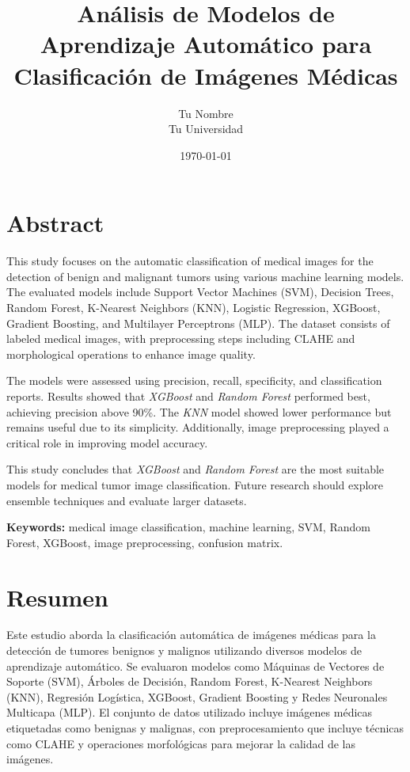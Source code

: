 \documentclass[12pt]{article}
\title{Análisis de Modelos de Aprendizaje Automático para Clasificación de Imágenes Médicas}
\author{Tu Nombre \\ Tu Universidad}
\date{\today}
\begin{document}
\maketitle

\section*{Abstract}
This study focuses on the automatic classification of medical images for the detection of benign and malignant tumors using various machine learning models. The evaluated models include Support Vector Machines (SVM), Decision Trees, Random Forest, K-Nearest Neighbors (KNN), Logistic Regression, XGBoost, Gradient Boosting, and Multilayer Perceptrons (MLP). The dataset consists of labeled medical images, with preprocessing steps including CLAHE and morphological operations to enhance image quality.

The models were assessed using precision, recall, specificity, and classification reports. Results showed that \textit{XGBoost} and \textit{Random Forest} performed best, achieving precision above 90\%. The \textit{KNN} model showed lower performance but remains useful due to its simplicity. Additionally, image preprocessing played a critical role in improving model accuracy.

This study concludes that \textit{XGBoost} and \textit{Random Forest} are the most suitable models for medical tumor image classification. Future research should explore ensemble techniques and evaluate larger datasets.

\textbf{Keywords:} medical image classification, machine learning, SVM, Random Forest, XGBoost, image preprocessing, confusion matrix.

\newpage

\section*{Resumen}
Este estudio aborda la clasificación automática de imágenes médicas para la detección de tumores benignos y malignos utilizando diversos modelos de aprendizaje automático. Se evaluaron modelos como Máquinas de Vectores de Soporte (SVM), Árboles de Decisión, Random Forest, K-Nearest Neighbors (KNN), Regresión Logística, XGBoost, Gradient Boosting y Redes Neuronales Multicapa (MLP). El conjunto de datos utilizado incluye imágenes médicas etiquetadas como benignas y malignas, con preprocesamiento que incluye técnicas como CLAHE y operaciones morfológicas para mejorar la calidad de las imágenes.
\end{document}
